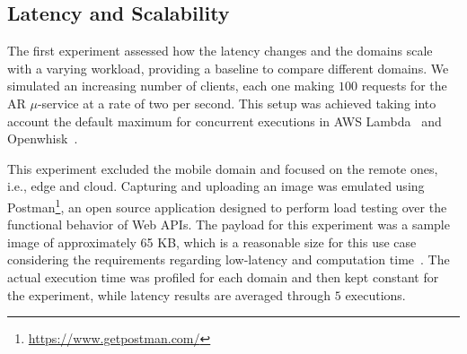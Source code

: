 \subsection{Latency and Scalability} 



The first experiment assessed how the latency changes and the domains scale with a varying workload, providing a baseline to compare different domains. We simulated an increasing number of clients, each one making $100$ requests for the AR $\mu$-service at a rate of two per second. This setup was achieved taking into account the default maximum for concurrent executions in AWS Lambda~\cite{AWSLambda}
and Openwhisk~\cite{OpenWhisk}.

This experiment excluded the mobile domain and focused on the remote ones, i.e., edge and cloud. Capturing and uploading an image was emulated using Postman\footnote{\url{https://www.getpostman.com/}}, an open source application designed to perform load testing over the functional behavior of Web APIs. The payload for this experiment was a sample image of approximately 65 KB, which is a reasonable size for this use case considering the requirements regarding low-latency and computation time~\cite{rodriguez16mobile}. The actual execution time was profiled for each domain and then kept constant for the experiment, while latency results are averaged through $5$ executions.




